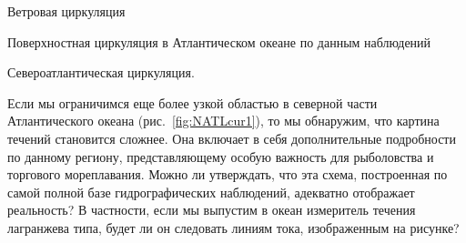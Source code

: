 \begin{chapter}{Ветровая циркуляция}
\begin{section}{Поверхностная циркуляция в Атлантическом океане по данным наблюдений}
\begin{paragraph}{Североатлантическая циркуляция.}

Если мы ограничимся еще более узкой областью в северной части Атлантического 
океана (рис.~\ref{fig:NATLcur1}), то мы обнаружим, что картина течений
становится сложнее. Она включает в себя дополнительные подробности
по данному региону, представляющему особую важность для рыболовства и
торгового мореплавания. Можно ли утверждать, что эта схема, построенная
по самой полной базе гидрографических наблюдений, адекватно отображает 
реальность? В частности, если мы выпустим в океан измеритель течения
лагранжева типа, будет ли он следовать линиям тока, изображенным на рисунке?
%


\end{paragraph}
\end{section}
\end{chapter}
